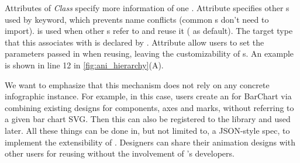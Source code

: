 Attributes of \textit{Class} specify more information of one \aniclass{}. 
Attribute  specifies other \aniclass{}s used by  keyword, which prevents name conflicts (common \aniunit{}s don't need to import). 
\aniclass{}  is used when other \aniclass{}s refer to and reuse it ( as default).
The target type that this \aniclass{} associates with is declared by .
Attribute  allow users to set the parameters passed in when reusing, leaving the customizability of \aniclass{}s.
An example is shown in line 12 in \autoref{fig:ani_hierarchy}(A).

We want to emphasize that this mechanism does not rely on any concrete infographic instance. 
For example, in this case, users create an \aniclass{} for BarChart via combining existing designs for components, \ie axes and marks, without referring to a given bar chart SVG.
Then this \aniclass{} can also be registered to the library and used later.
All these things can be done in, but not limited to, a JSON-style spec, to implement the extensibility of \gaia{}.
Designers can share their animation designs with other users for reusing without the involvement of \gaia{}'s developers.

